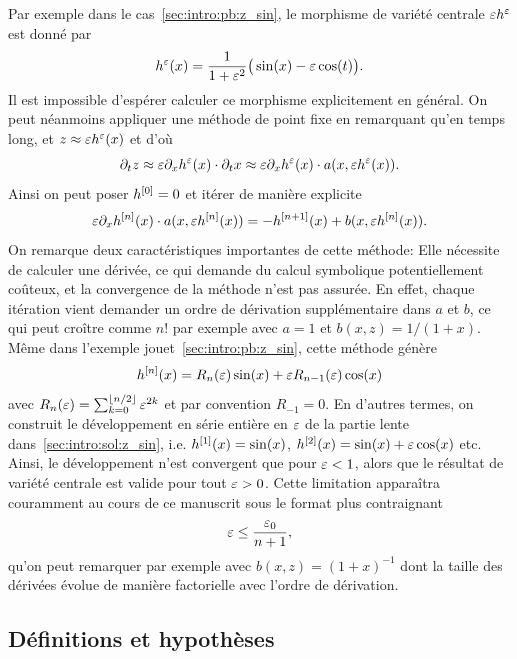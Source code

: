 Par exemple dans le cas~\eqref{sec:intro:pb:z_sin}, le morphisme de variété centrale $\varepsilon h^{\varepsilon}$ est donné par 
\begin{equation*}
    h^{\varepsilon}(x) 
    = \frac{1}{1 + \varepsilon^2} \big( \sin(x) - \varepsilon \cos(t) \big) .
\end{equation*}
Il est impossible d'espérer calculer ce morphisme explicitement en général. On peut néanmoins appliquer une méthode de point fixe en remarquant qu'en temps long, et $z \approx \varepsilon h^{\varepsilon}(x)$ et d'où 
\begin{equation*}
    \partial_t z \approx \varepsilon \partial_x h^{\varepsilon}(x) \cdot \partial_t x
    \approx \varepsilon \partial_x h^{\varepsilon}(x) \cdot a(x, \varepsilon h^{\varepsilon}(x)) . 
\end{equation*} Ainsi on peut poser $h^{[0]} = 0$ et itérer de manière explicite
\begin{equation*}
    \varepsilon \partial_x h^{[n]}(x) \cdot a(x, \varepsilon h^{[n]} (x)) 
    = - h^{[n+1]}(x) + b(x, \varepsilon h^{[n]} (x)) .
\end{equation*}
On remarque deux caractéristiques importantes de cette méthode: Elle nécessite de calculer une dérivée, ce qui demande du calcul symbolique potentiellement coûteux, et la convergence de la méthode n'est pas assurée. En effet, chaque itération vient demander un ordre de dérivation supplémentaire dans $a$ et $b$, ce qui peut croître comme $n!$ par exemple avec $a = 1$ et $b(x,z) = 1/(1+x)$. Même dans l'exemple jouet~\eqref{sec:intro:pb:z_sin}, cette méthode génère
\begin{equation*}
    h^{[n]}(x) = R_n(\varepsilon) \sin(x) + \varepsilon R_{n-1}(\varepsilon) \cos(x) 
\end{equation*}
avec $R_n(\varepsilon) = \sum_{k = 0}^{\left\lfloor n/2 \right\rfloor} \varepsilon^{2k}$ et par convention $R_{-1} = 0$. En d'autres termes, on construit le développement en série entière en $\varepsilon$ de la partie lente dans~\eqref{sec:intro:sol:z_sin}, i.e. $h^{[1]}(x) = \sin(x)$, $h^{[2]} (x) = \sin(x) + \varepsilon \cos(x)$ etc. Ainsi, le développement n'est convergent que pour $\varepsilon < 1$, alors que le résultat de variété centrale est valide pour tout $\varepsilon > 0$. 
%
Cette limitation apparaîtra couramment au cours de ce manuscrit sous le format plus contraignant
\begin{equation*}
    \varepsilon \leq \frac{\varepsilon_0}{n+1} ,
\end{equation*}
qu'on peut remarquer par exemple avec $b(x,z) = (1+x)^{-1}$ dont la taille des dérivées évolue de manière factorielle avec l'ordre de dérivation. 




\subsection*{Définitions et hypothèses}




